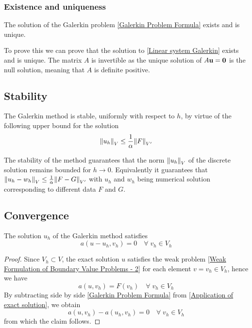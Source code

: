 \subsubsection*{Existence and uniqueness}

    \begin{corollary}
    The solution of the Galerkin problem \eqref{Galerkin Problem Formula} exists and is unique.
\end{corollary}

To prove this we can prove that the solution to \eqref{Linear system Galerkin} exists and is unique. The matrix \(A\) is invertible as the unique solution of \(A\textbf{u} = \textbf{0}\) is the null solution, meaning that \(A\) is definite positive.
\subsection*{Stability}
\begin{corollary}
    The Galerkin method is stable, uniformly with respect to \(h\), by virtue of the following upper bound for the solution
    \[
        \norm{u_h}_V \leq \frac{1}{\alpha}\norm{F}_{V'}
    \]
\end{corollary}
The stability of the method guarantees that the norm \(\norm{u_h}_V\) of the discrete solution remains bounded for \(h \to 0\). Equivalently it guarantees that \(\norm{u_h-w_h}_V \leq \frac{1}{\alpha}\norm{F-G}_{V'}\) with \(u_h\) and \(w_h\) being numerical solution corresponding to different data \(F\) and \(G\).
\subsection*{Convergence}

    \begin{lemma}
    The solution \(u_h\) of the Galerkin method satisfies 
    \begin{equation}
        a(u-u_h, v_h) = 0 \quad \forall \; v_h \in V_h \label{Galerkin orthogonality}
    \end{equation}
\end{lemma}

\begin{proof}
    Since \(V_h \subset V\), the exact solution \(u\) satisfies the weak problem \eqref{Weak Formulation of Boundary Value Problems - 2} for each element \(v = v_h \in V_h\), hence we have 
    \begin{equation}
        a(u, v_h) = F(v_h) \quad \forall \; v_h \in V_h \label{Application of exact solution}
    \end{equation}
    By subtracting side by side \eqref{Galerkin Problem Formula} from \eqref{Application of exact solution}, we obtain 
    \[
        a(u,v_h)-a(u_h, v_h) = 0 \quad \forall \; v_h \in V_h
    \]
    from which the claim follows.
\end{proof}



